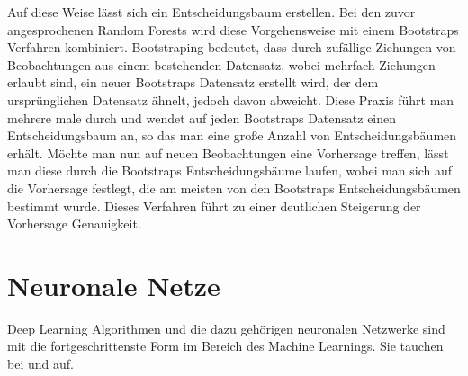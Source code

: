 \documentclass[a4paper,12pt]{thesis}
\begin{document}
Auf diese Weise lässt sich ein Entscheidungsbaum erstellen. Bei den zuvor angesprochenen Random Forests wird diese Vorgehensweise mit einem Bootstraps Verfahren kombiniert. Bootstraping bedeutet, dass durch zufällige Ziehungen von Beobachtungen aus einem bestehenden Datensatz, wobei mehrfach Ziehungen erlaubt sind, ein neuer Bootstraps Datensatz erstellt wird, der dem ursprünglichen Datensatz ähnelt, jedoch davon abweicht. Diese Praxis führt man mehrere male durch und wendet auf jeden Bootstraps Datensatz einen Entscheidungsbaum an, so das man eine große Anzahl von Entscheidungsbäumen erhält. Möchte man nun auf neuen Beobachtungen eine Vorhersage treffen, lässt man diese durch die Bootstraps Entscheidungsbäume laufen, wobei man sich auf die Vorhersage festlegt, die am meisten von den Bootstraps Entscheidungsbäumen bestimmt wurde. Dieses Verfahren führt zu einer deutlichen Steigerung der Vorhersage Genauigkeit.

\section{Neuronale Netze}


Deep Learning Algorithmen und die dazu gehörigen neuronalen Netzwerke sind mit die fortgeschrittenste Form im Bereich des Machine Learnings. Sie tauchen bei \cite{Broucke2019} und \cite{Mitchell2018PredictingBT} auf.
\end{document}
